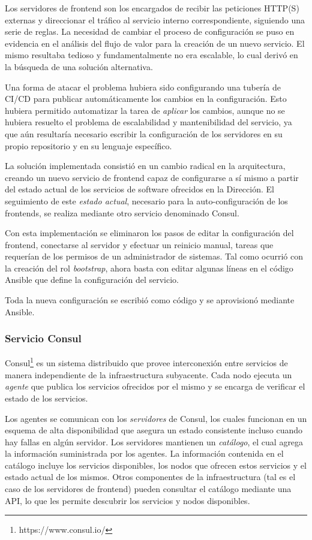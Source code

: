Los servidores de frontend son los encargados de recibir las peticiones HTTP(S) externas y direccionar el tráfico al servicio interno correspondiente, siguiendo una serie de reglas. La necesidad de cambiar el proceso de configuración se puso en evidencia en el análisis del flujo de valor para la creación de un nuevo servicio. El mismo resultaba tedioso y fundamentalmente no era escalable, lo cual derivó en la búsqueda de una solución alternativa.

Una forma de atacar el problema hubiera sido configurando una tubería de CI/CD para publicar automáticamente los cambios en la configuración. Esto hubiera permitido automatizar la tarea de \textit{aplicar} los cambios, aunque no se hubiera resuelto el problema de escalabilidad y mantenibilidad del servicio, ya que aún resultaría necesario escribir la configuración de los servidores en su propio repositorio y en su lenguaje específico.

La solución implementada consistió en un cambio radical en la arquitectura, creando un nuevo servicio de frontend capaz de configurarse a sí mismo a partir del estado actual de los servicios de software ofrecidos en la Dirección. El seguimiento de este \textit{estado actual}, necesario para la auto-configuración de los frontends, se realiza mediante otro servicio denominado Consul.

Con esta implementación se eliminaron los pasos de editar la configuración del frontend, conectarse al servidor y efectuar un reinicio manual, tareas que requerían de los permisos de un administrador de sistemas. Tal como ocurrió con la creación del rol \textit{bootstrap}, ahora basta con editar algunas líneas en el código Ansible que define la configuración del servicio.

Toda la nueva configuración se escribió como código y se aprovisionó mediante Ansible.

\subsubsection{Servicio Consul}

Consul\footnote{ https://www.consul.io/} es un sistema distribuido que provee interconexión entre servicios de manera independiente de la infraestructura subyacente. Cada nodo ejecuta un \textit{agente} que publica los servicios ofrecidos por el mismo y se encarga de verificar el estado de los servicios.

Los agentes se comunican con los \textit{servidores} de Consul, los cuales funcionan en un esquema de alta disponibilidad que asegura un estado consistente incluso cuando hay fallas en algún servidor. Los servidores mantienen un \textit{catálogo}, el cual agrega la información suministrada por los agentes. La información contenida en el catálogo incluye los servicios disponibles, los nodos que ofrecen estos servicios y el estado actual de los mismos. Otros componentes de la infraestructura (tal es el caso de los servidores de frontend) pueden consultar el catálogo mediante una API, lo que les permite descubrir los servicios y nodos disponibles.


